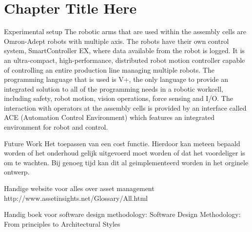 
\chapter{Chapter Title Here} %

\label{Chapter3} %

Experimental setup
The robotic arms that are used within the assembly cells are Omron-Adept robots with multiple axis. The robots have their own control system, SmartController EX\textsuperscript{\tiny\textregistered}, where data available from the robot is logged. It is an ultra-compact, high-performance, distributed robot motion controller capable of controlling an entire production line managing multiple robots. The programming language that is used is V+\textsuperscript{\tiny\textregistered}, the only language to provide an integrated solution to all of the programming needs in a robotic workcell, including safety, robot motion, vision operations, force sensing and I/O. The interaction with operators at the assembly cells is provided by an interface called ACE (Automation Control Environment) which features an integrated environment for robot and control. 

Future Work
Het toepassen van een cost functie. Hierdoor kan meteen bepaald worden of het onderhoud gelijk uitgevoerd moet worden of dat het voordeliger is om te wachten. Bij genoeg tijd kan dit al geimplementeerd worden in het orginele ontwerp.

Handige website voor alles over asset management
http://www.assetinsights.net/Glossary/All.html

Handig boek voor software design methodology:
Software Design Methodology: From principles to Architectural Styles